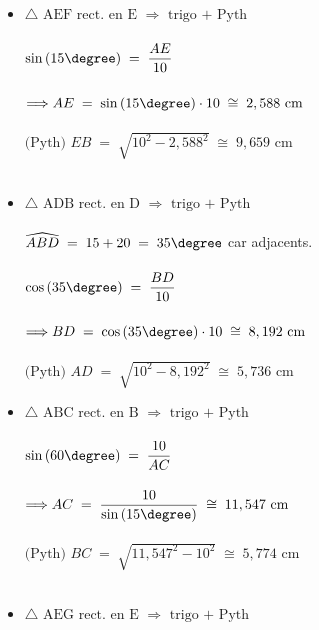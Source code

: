 \begin{itemize}
	\item[$\bullet$]
	$\triangle\mbox{ AEF rect. en E }\Rightarrow\mbox{ trigo + Pyth }$\\
	$ $\\
	$\sin{(15\degree)}\;=\;\dfrac{AE}{10}$\\
	$ $\\
	$\Longrightarrow AE\;=\;\sin{(15\degree)}\cdot10\;\cong\;2,588\mbox{ cm}$\\
	$ $\\
	$\mbox{(Pyth) }  EB\;=\;\sqrt{10^2-2,588^2}\;\cong\;9,659\mbox{ cm}$\\
	$ $\\
	\item[$\bullet$]
	$\triangle\mbox{ ADB rect. en D }\Rightarrow\mbox{ trigo + Pyth }$\\
	$ $\\
	$\widehat{ABD}\;=\;15+20\;=\;35\degree$ car adjacents.\\
	$ $\\
	$\cos{(35\degree)}\;=\;\dfrac{BD}{10}$\\
	$ $\\
	$\Longrightarrow BD\;=\;\cos{(35\degree)}\cdot10\;\cong\;8,192\mbox{ cm}$\\
	$ $\\
	$\mbox{(Pyth) }  AD\;=\;\sqrt{10^2-8,192^2}\;\cong\;5,736\mbox{ cm}$\\
	\newpage
	\item[$\bullet$]
	$\triangle\mbox{ ABC rect. en B }\Rightarrow\mbox{ trigo + Pyth }$\\
	$ $\\
	$\sin{(60\degree)}\;=\;\dfrac{10}{AC}$\\
	$ $\\
	$\Longrightarrow AC\;=\;\dfrac{10}{\sin{(15\degree)}}\;\cong\;11,547\mbox{ cm}$\\
	$ $\\
	$\mbox{(Pyth) }  BC\;=\;\sqrt{11,547^2-10^2}\;\cong\;5,774\mbox{ cm}$\\
	$ $\\	
	\item[$\bullet$]
	$\triangle\mbox{ AEG rect. en E }\Rightarrow\mbox{ trigo + Pyth }$\\
	$ $\\

\end{itemize}
